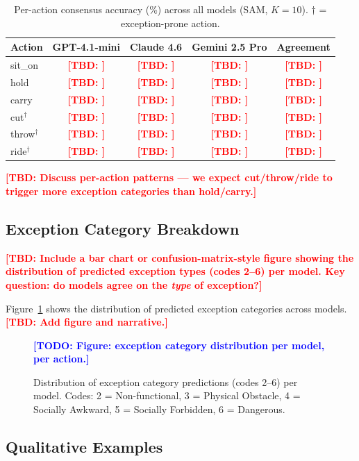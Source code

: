 \documentclass[runningheads]{llncs}
\newcommand{\TBD}[1]{\textcolor{red}{\textbf{[TBD: #1]}}}
\newcommand{\TODO}[1]{\textcolor{blue}{\textbf{[TODO: #1]}}}
\begin{document}
\begin{table}[t]
  \centering
  \caption{Per-action consensus accuracy (\%) across all models
    (SAM, $K=10$). $\dagger$ = exception-prone action.}
  \label{tab:per_action}
  \begin{tabular}{lcccc}
    \toprule
    Action & GPT-4.1-mini & Claude 4.6 & Gemini 2.5 Pro & Agreement \\
    \midrule
    sit\_on    & \TBD{} & \TBD{} & \TBD{} & \TBD{} \\
    hold       & \TBD{} & \TBD{} & \TBD{} & \TBD{} \\
    carry      & \TBD{} & \TBD{} & \TBD{} & \TBD{} \\
    cut$^\dagger$ & \TBD{} & \TBD{} & \TBD{} & \TBD{} \\
    throw$^\dagger$ & \TBD{} & \TBD{} & \TBD{} & \TBD{} \\
    ride$^\dagger$  & \TBD{} & \TBD{} & \TBD{} & \TBD{} \\
    \bottomrule
  \end{tabular}
\end{table}

\TBD{Discuss per-action patterns — we expect cut/throw/ride to trigger
more exception categories than hold/carry.}

\subsection{Exception Category Breakdown}
\label{sec:exceptions}

\TBD{Include a bar chart or confusion-matrix-style figure showing the
distribution of predicted exception types (codes 2--6) per model.
Key question: do models agree on the \emph{type} of exception?}

Figure~\ref{fig:exception_dist} shows the distribution of predicted
exception categories across models. \TBD{Add figure and narrative.}

\begin{figure}[t]
  \centering
  \TODO{Figure: exception category distribution per model, per action.}
  \caption{Distribution of exception category predictions (codes 2--6)
    per model. Codes: 2 = Non-functional, 3 = Physical Obstacle,
    4 = Socially Awkward, 5 = Socially Forbidden, 6 = Dangerous.}
  \label{fig:exception_dist}
\end{figure}

\subsection{Qualitative Examples}
\label{sec:qualitative}
\end{document}
